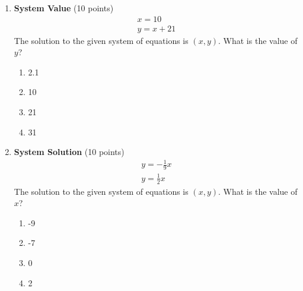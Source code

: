 \begin{enumerate}
  \item \textbf{System Value} (10 points)\\
  \[\begin{gathered}
  x=10 \\
  y=x+21
  \end{gathered}\]
  The solution to the given system of equations is $(x,y)$. What is the value of $y$?\\
  \begin{enumerate}[label=(\Alph*)]
    \item 2.1
    \item 10
    \item 21
    \item 31
  \end{enumerate}
  \begin{subanswer}
  \end{subanswer}

  \item \textbf{System Solution} (10 points)\\
  \[\begin{gathered}
  y=-\frac{1}{9}x \\
  y=\frac{1}{2}x
  \end{gathered}\]
  The solution to the given system of equations is $(x,y)$. What is the value of $x$?\\
  \begin{enumerate}[label=(\Alph*)]
    \item -9
    \item -7
    \item 0
    \item 2
  \end{enumerate}
  \begin{subanswer}
  \end{subanswer}

  \newpage


\end{enumerate}
